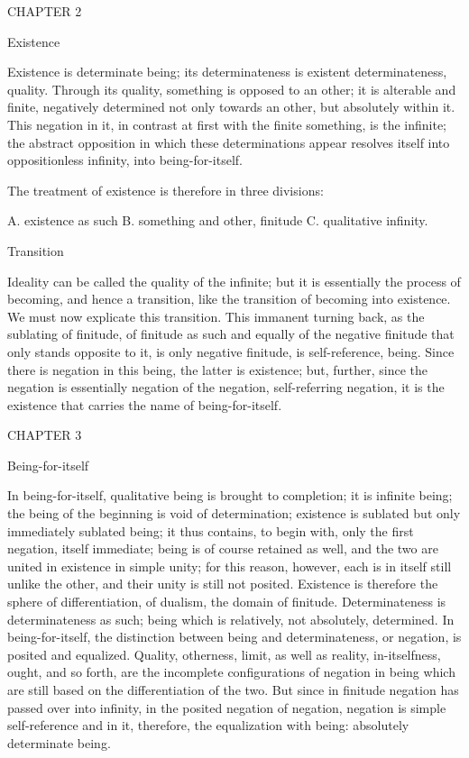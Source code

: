 CHAPTER 2

Existence

Existence is determinate being;
its determinateness is existent determinateness, quality.
Through its quality, something is opposed to an other;
it is alterable and finite,
negatively determined not only towards an other,
but absolutely within it.
This negation in it,
in contrast at first
with the finite something,
is the infinite;
the abstract opposition
in which these determinations appear
resolves itself into oppositionless infinity,
into being-for-itself.

The treatment of existence is therefore in three divisions:

A. existence as such
B. something and other, finitude
C. qualitative infinity.

Transition

Ideality can be called the quality of the infinite;
but it is essentially the process of becoming,
and hence a transition, like the transition
of becoming into existence.
We must now explicate this transition.
This immanent turning back, as the sublating of finitude,
of finitude as such and equally of the negative finitude
that only stands opposite to it, is only negative finitude,
is self-reference, being.
Since there is negation in this being, the latter is existence;
but, further, since the negation is essentially
negation of the negation, self-referring negation,
it is the existence that carries the name of being-for-itself.

CHAPTER 3

Being-for-itself

In being-for-itself,
qualitative being is brought to completion;
it is infinite being;
the being of the beginning is void of determination;
existence is sublated but only immediately sublated being;
it thus contains, to begin with,
only the first negation, itself immediate;
being is of course retained as well,
and the two are united in existence in simple unity;
for this reason, however, each is in itself still unlike the other,
and their unity is still not posited.
Existence is therefore the sphere of differentiation,
of dualism, the domain of finitude.
Determinateness is determinateness as such;
being which is relatively, not absolutely, determined.
In being-for-itself, the distinction
between being and determinateness,
or negation, is posited and equalized.
Quality, otherness, limit, as well as reality, in-itselfness,
ought, and so forth, are the incomplete configurations of negation in being
which are still based on the differentiation of the two.
But since in finitude negation has passed over into infinity,
in the posited negation of negation,
negation is simple self-reference
and in it, therefore, the equalization with being:
absolutely determinate being.

